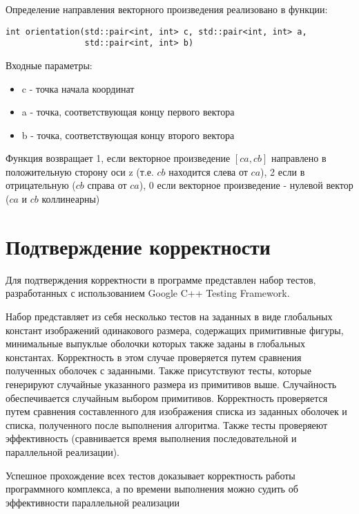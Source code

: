 \documentclass{report}
\begin{document}
\par Определение направления векторного произведения реализовано в функции:
\begin{lstlisting}
int orientation(std::pair<int, int> c, std::pair<int, int> a,
                std::pair<int, int> b)
\end{lstlisting}
\par Входные параметры:
\begin{itemize}
\item c - точка начала координат
\item a - точка, соответствующая концу первого вектора
\item b - точка, соответствующая концу второго вектора
\end{itemize}

\par Функция возвращает 1, если векторное произведение $[ca, cb]$ направлено в положительную сторону оси z (т.е. $cb$ находится слева от $ca$), 2 если в отрицательную ($cb$ справа от $ca$), 0 если векторное произведение - нулевой вектор ($ca$ и $cb$ коллинеарны)

\newpage

\section*{Подтверждение корректности}
Для подтверждения корректности в программе представлен набор тестов, разработанных с использованием Google C++ Testing Framework.
\par Набор представляет из себя несколько тестов на заданных в виде глобальных констант изображений одинакового размера, содержащих примитивные фигуры, минимальные выпуклые оболочки которых также заданы в глобальных константах. Корректность в этом случае проверяется путем сравнения полученных оболочек с заданными. Также присутствуют тесты, которые генерируют случайные указанного размера из примитивов выше. Случайность обеспечивается случайным выбором примитивов. Корректность проверяется путем сравнения составленного для изображения списка из заданных оболочек и списка, полученного после выполнения алгоритма. Также тесты проверяеют эффективность (сравнивается время выполнения последовательной и параллельной реализации).
\par Успешное прохождение всех тестов доказывает корректность работы программного комплекса, а по времени выполнения можно судить об эффективности параллельной реализации
\newpage
\end{document}
